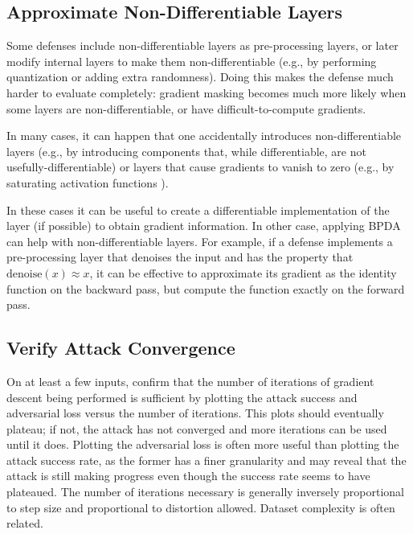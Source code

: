 \documentclass{article} %
\begin{document}
\subsection{Approximate Non-Differentiable Layers}
\label{sec:bpda}

Some defenses include non-differentiable layers as pre-processing
layers, or later modify internal layers to make them non-differentiable
(e.g., by performing quantization or adding extra randomness).
%
Doing this makes the defense much harder to evaluate completely:
gradient masking becomes much more likely when some layers are
non-differentiable, or have difficult-to-compute gradients.

In many cases, it can happen that one accidentally introduces non-differentiable
layers \citep{athalye2018obfuscated} (e.g., by introducing components
that, while differentiable, are not usefully-differentiable) or layers that
cause gradients to vanish to zero (e.g., by saturating
activation functions \citep{brendel2017comment,carlini2016defensive}).

In these cases it can be useful to create a
differentiable implementation of the layer (if possible) to
obtain gradient information.
%
In other case, applying BPDA \citep{athalye2018obfuscated} can help
with non-differentiable layers.
%
For example, if a defense implements a pre-processing layer that
denoises the input and has the property that $\text{denoise}(x) \approx x$,
it can be effective to approximate its gradient as the identity
function on the backward pass, but compute the function exactly
on the forward pass.


\subsection{Verify Attack Convergence}
\label{sec:converge}

On at least a few inputs, confirm
that the number of iterations of gradient descent being performed is
sufficient by plotting the attack success and adversarial loss versus the number of
iterations.
%
This plots should eventually plateau; if not, the attack
has not converged and more iterations can be used until
it does. Plotting the adversarial loss is often more useful than plotting the attack success rate, as the former has a finer granularity and may reveal that the attack is still making progress even though the success rate seems to have plateaued.
The number of
iterations necessary is generally inversely proportional to step size and
proportional to distortion allowed.
%
Dataset complexity is often related.
\end{document}
